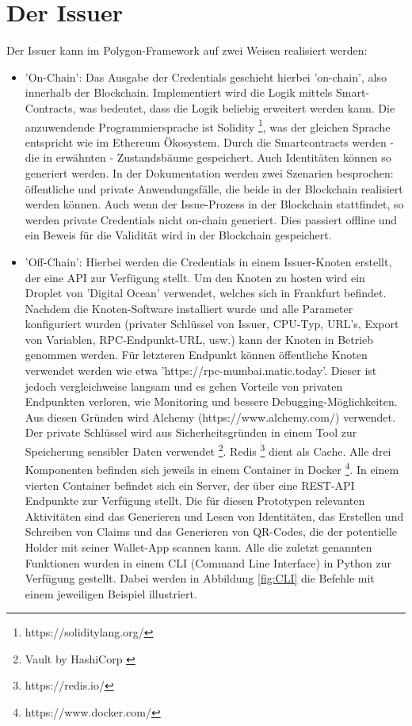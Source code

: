 \section{Der Issuer}
Der Issuer kann im Polygon-Framework auf zwei Weisen realisiert werden:
\begin{itemize}
	\item 'On-Chain': Das Ausgabe der Credentials geschieht hierbei 'on-chain', also innerhalb der Blockchain. Implementiert wird die Logik mittels Smart-Contracts, was bedeutet, dass die Logik beliebig erweitert werden kann. Die anzuwendende Programmiersprache ist Solidity \footnote{https://soliditylang.org/}, was der gleichen Sprache entspricht wie im Ethereum Ökosystem. Durch die Smartcontracts werden - die in  erwähnten - Zustandsbäume gespeichert. Auch Identitäten können so generiert  werden. In der Dokumentation werden zwei Szenarien besprochen: öffentliche und private Anwendungsfälle, die beide in der Blockchain realisiert werden können. Auch wenn der Issue-Prozess in der Blockchain stattfindet, so werden private Credentials nicht on-chain generiert. Dies passiert offline und ein Beweis für die Validität wird in der Blockchain gespeichert.
	\item  'Off-Chain': Hierbei werden die Credentials in einem Issuer-Knoten erstellt, der eine API zur Verfügung stellt. Um den Knoten zu hosten wird ein Droplet von 'Digital Ocean' verwendet,  welches sich in Frankfurt befindet. Nachdem die Knoten-Software installiert wurde und alle Parameter konfiguriert wurden (privater Schlüssel von Issuer, CPU-Typ, URL's, Export von Variablen, RPC-Endpunkt-URL, usw.) kann der Knoten in Betrieb genommen werden. Für letzteren Endpunkt können öffentliche Knoten verwendet werden wie etwa 'https://rpc-mumbai.matic.today'. Dieser ist jedoch vergleichweise langsam und es gehen Vorteile von privaten Endpunkten verloren, wie Monitoring und bessere Debugging-Möglichkeiten. Aus diesen Gründen wird Alchemy (https://www.alchemy.com/) verwendet. Der private Schlüssel wird aus Sicherheitsgründen in einem Tool zur Speicherung sensibler Daten verwendet \footnote{Vault by HashiCorp \label{vault}}. Redis \footnote{https://redis.io/} dient als Cache. Alle drei Komponenten befinden sich jeweils in einem Container in Docker \footnote{https://www.docker.com/}. In einem vierten Container befindet sich ein Server, der über eine REST-API Endpunkte zur Verfügung stellt. Die für diesen Prototypen relevanten Aktivitäten sind das Generieren und Lesen von Identitäten, das Erstellen und Schreiben von Claims und das Generieren von QR-Codes, die der potentielle Holder mit seiner Wallet-App scannen kann. Alle die zuletzt genannten Funktionen wurden in einem CLI (Command Line Interface) in Python zur Verfügung gestellt. Dabei werden in Abbildung \ref{fig:CLI} die Befehle mit einem jeweiligen Beispiel illustriert.
	

\end{itemize}
